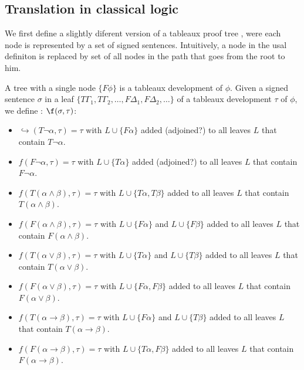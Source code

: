 \documentclass[runningheads]{llncs}
\begin{document}
\subsection{Translation in classical logic}
    We first define a slightly diferent version of a tableaux proof tree \cite{book1}, 
    were each node is represented by a set of signed sentences. Intuitively, 
    a node in the usal definiton is replaced by set of 
    all nodes in the path that goes from the root to him. %

    A tree with a single node $\{F \phi \}$ is a tableaux development of $\phi$. 
    Given a signed sentence $\sigma$ in a leaf $\{T \Gamma_1, T\Gamma_2, \ldots, F \Delta_1, F \Delta_2, \ldots\}$ of a
    tableaux development $\tau$ of $\phi$, we define : 
    $\f(\sigma,\tau)$:
    \begin{itemize}
        \item $\hookrightarrow(T \neg \alpha,\tau) = \tau$ with $L \cup \{F \alpha\}$ 
        added (adjoined?) to all leaves $L$ that contain $T \neg \alpha$.
        \item $f(F \neg \alpha,\tau) = \tau$ with $L \cup \{T \alpha\}$ 
        added (adjoined?) to all leaves $L$ that contain $F \neg \alpha$.
        \item $f(T (\alpha \land \beta),\tau) = \tau$ with $L \cup \{T \alpha, T \beta\}$ 
        added to all leaves $L$ that contain $T (\alpha \land \beta)$.
        \item $f(F (\alpha \land \beta),\tau) = \tau$ with $L \cup \{F \alpha\}$ and $L \cup \{F \beta\}$ 
        added to all leaves $L$ that contain $F (\alpha \land \beta)$.
        \item $f(T (\alpha \lor \beta),\tau) = \tau$ with $L \cup \{T \alpha\}$ and $L \cup \{T \beta\}$ 
        added to all leaves $L$ that contain $T (\alpha \lor \beta)$.
        \item $f(F (\alpha \lor \beta),\tau) = \tau$ with $L \cup \{F \alpha, F \beta\}$ 
        added to all leaves $L$ that contain $F (\alpha \lor \beta)$.
        \item $f(T (\alpha \to \beta),\tau) = \tau$ with $L \cup \{F \alpha\}$ and $L \cup \{T \beta\}$ 
        added to all leaves $L$ that contain $T (\alpha \to \beta)$.
        \item $f(F (\alpha \to \beta),\tau) = \tau$ with $L \cup \{T \alpha, F \beta\}$ 
        added to all leaves $L$ that contain $F (\alpha \to \beta)$.
     \end{itemize}
\end{document}
